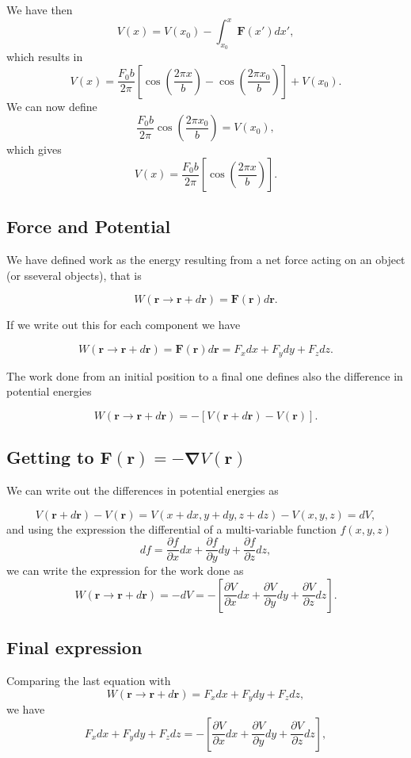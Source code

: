\documentclass[%
oneside,                 %
final,                   %
10pt]{article}
\begin{document}
We have then
\[
V(x)=V(x_0)-\int_{x_0}^x \bm{F}(x')dx',
\]
which results in
\[
V(x)=\frac{F_0b}{2\pi}\left[\cos{(\frac{2\pi x}{b})}-\cos{(\frac{2\pi x_0}{b})}\right]+V(x_0).
\]
We can now define
\[
\frac{F_0b}{2\pi}\cos{(\frac{2\pi x_0}{b})}=V(x_0),
\]
which gives 
\[
V(x)=\frac{F_0b}{2\pi}\left[\cos{(\frac{2\pi x}{b})}\right].
\]

\subsection*{Force and Potential}

We have defined work as the energy resulting from a net force acting
on an object (or sseveral objects), that is

\[
W(\bm{r}\rightarrow \bm{r}+d\bm{r})= \bm{F}(\bm{r})d\bm{r}.
\]

If we write out this for each component we have

\[
W(\bm{r}\rightarrow \bm{r}+d\bm{r})=\bm{F}(\bm{r})d\bm{r}=F_xdx+F_ydy+F_zdz.
\]

The work done from an initial position to a final one defines also the difference in potential energies

\[
W(\bm{r}\rightarrow \bm{r}+d\bm{r})=-\left[V(\bm{r}+d\bm{r})-V(\bm{r})\right].
\]

\subsection*{Getting to $\bm{F}(\bm{r})=-\bm{\nabla} V(\bm{r})$}

We can write out the differences in potential energies as

\[
V(\bm{r}+d\bm{r})-V(\bm{r})=V(x+dx,y+dy,z+dz)-V(x,y,z)=dV,
\]
and using the expression the differential of a multi-variable function $f(x,y,z)$ 
\[
df=\frac{\partial f}{\partial x}dx+\frac{\partial f}{\partial y}dy+\frac{\partial f}{\partial z}dz,
\]
we can write the expression for the work done as
\[
W(\bm{r}\rightarrow \bm{r}+d\bm{r})=-dV=-\left[\frac{\partial V}{\partial x}dx+\frac{\partial V}{\partial y}dy+\frac{\partial V}{\partial z}dz \right].
\]

\subsection*{Final expression}

Comparing the last equation with 
\[
W(\bm{r}\rightarrow \bm{r}+d\bm{r})=F_xdx+F_ydy+F_zdz,
\]
we have
\[
F_xdx+F_ydy+F_zdz=-\left[\frac{\partial V}{\partial x}dx+\frac{\partial V}{\partial y}dy+\frac{\partial V}{\partial z}dz \right],
\]
\end{document}
